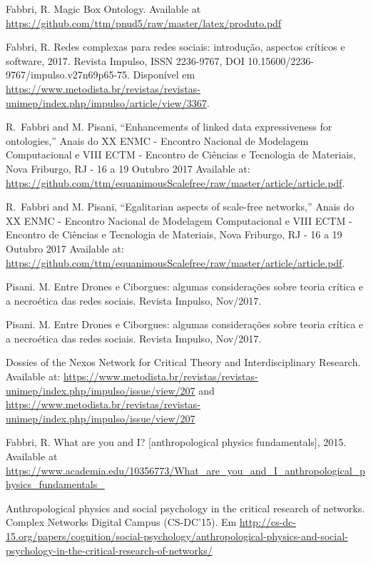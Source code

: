 \documentclass[letterpaper,10pt]{article}
\begin{document}
\begin{thebibliography}{99}
	Fabbri, R. Magic Box Ontology.
		Available at \url{https://github.com/ttm/pnud5/raw/master/latex/produto.pdf}

	Fabbri, R. Redes complexas para redes sociais: introdução, aspectos críticos e software, 2017.
		Revista Impulso,
		ISSN 2236-9767,
		DOI 10.15600/2236-9767/impulso.v27n69p65-75.
		Disponível em
		\url{https://www.metodista.br/revistas/revistas-unimep/index.php/impulso/article/view/3367}.

  R.~Fabbri and M. Pisani,
  ``Enhancements of linked data expressiveness for ontologies,''
  Anais do XX ENMC - Encontro Nacional de Modelagem Computacional e
  VIII ECTM - Encontro de Ci\^encias e Tecnologia de Materiais, Nova Friburgo,
  RJ - 16 a 19 Outubro 2017
		Available at: \url{https://github.com/ttm/equanimousScalefree/raw/master/article/article.pdf}.

  R.~Fabbri and M. Pisani,
  ``Egalitarian aspects of scale-free networks,''
  Anais do XX ENMC - Encontro Nacional de Modelagem Computacional e
  VIII ECTM - Encontro de Ci\^encias e Tecnologia de Materiais, Nova Friburgo,
  RJ - 16 a 19 Outubro 2017
		Available at: \url{https://github.com/ttm/equanimousScalefree/raw/master/article/article.pdf}.

	Pisani. M.
	Entre Drones e Ciborgues: algumas considerações sobre teoria crítica e a necroética das redes sociais. Revista Impulso, Nov/2017.

	Pisani. M.
	Entre Drones e Ciborgues: algumas considerações sobre teoria crítica e a necroética das redes sociais. Revista Impulso, Nov/2017.

	Dossies of the Nexos Network for Critical Theory and Interdisciplinary Research. Available at: \url{https://www.metodista.br/revistas/revistas-unimep/index.php/impulso/issue/view/207} and \url{https://www.metodista.br/revistas/revistas-unimep/index.php/impulso/issue/view/207}

	Fabbri, R. What are you and I? [anthropological physics fundamentals], 2015. Available at \url{https://www.academia.edu/10356773/What\_are\_you\_and\_I\_anthropological\_physics\_fundamentals\_}

	Anthropological physics and social psychology in the critical research of networks. Complex Networks Digital Campus (CS-DC'15).
	Em \url{http://cs-dc-15.org/papers/cognition/social-psychology/anthropological-physics-and-social-psychology-in-the-critical-research-of-networks/}


\end{thebibliography}
\end{document}
